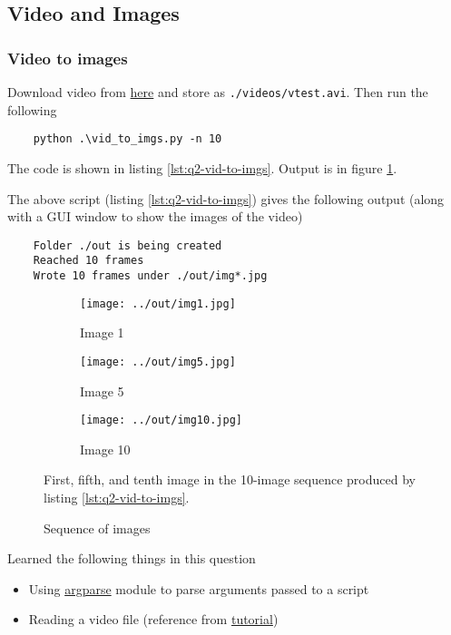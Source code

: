 \subsection{Video and Images}

\subsubsection*{Video to images}

Download video from \href{https://github.com/opencv/opencv/blob/master/samples/data/vtest.avi}{here} and store as \texttt{./videos/vtest.avi}. Then run the following

\begin{verbatim}
    python .\vid_to_imgs.py -n 10
\end{verbatim}

The code is shown in listing \ref{lst:q2-vid-to-imgs}. Output is in figure \ref{fig:q2-v2i-seq}.



The above script (listing \ref{lst:q2-vid-to-imgs}) gives the following output (along with a GUI window to show the images of the video)

\begin{verbatim}
    Folder ./out is being created
    Reached 10 frames
    Wrote 10 frames under ./out/img*.jpg
\end{verbatim}

\begin{figure}[t]
    \centering
    \begin{subfigure}[b]{0.3\textwidth}
        \texttt{[image: ../out/img1.jpg]}
        \caption{Image 1}
    \end{subfigure}
    \begin{subfigure}[b]{0.3\textwidth}
        \texttt{[image: ../out/img5.jpg]}
        \caption{Image 5}
    \end{subfigure}
    \begin{subfigure}[b]{0.3\textwidth}
        \texttt{[image: ../out/img10.jpg]}
        \caption{Image 10}
    \end{subfigure}
    \caption{Sequence of images}
    \label{fig:q2-v2i-seq}
    \small
        First, fifth, and tenth image in the 10-image sequence produced by listing \ref{lst:q2-vid-to-imgs}.
\end{figure}

Learned the following things in this question

\begin{itemize}
    \item Using \href{https://docs.python.org/3.10/library/argparse.html}{argparse} module to parse arguments passed to a script
    \item Reading a video file (reference from \href{https://docs.opencv.org/4.x/dd/d43/tutorial_py_video_display.html}{tutorial})
\end{itemize}
